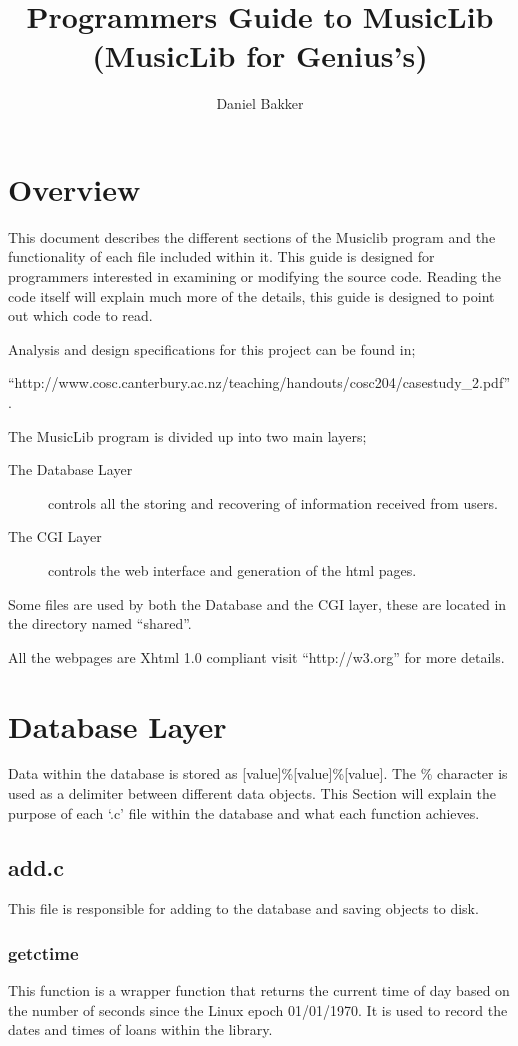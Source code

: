 \documentclass{article}
\title{Programmers Guide to MusicLib (MusicLib for Genius's)}
\author{Daniel Bakker}
\begin{document}
\maketitle
\tableofcontents
\newpage
\section{Overview}
This document describes the different sections of the Musiclib program and the functionality of each file included within it. This guide is designed for programmers interested in examining or modifying the source code. Reading the code itself will explain much more of the details, this guide is designed to point out which code to read.

Analysis and design specifications for this project can be found in;

 ``http://www.cosc.canterbury.ac.nz/teaching/handouts/cosc204/casestudy\_2.pdf''.

The MusicLib program is divided up into two main layers;
\begin{description} 
\item[The Database Layer] controls all the storing and recovering of information received from users.
\item[The CGI Layer] controls the web interface and generation of the html pages.
\end{description}

Some files are used by both the Database and the CGI layer, these are located in the directory named ``shared''.

All the webpages are Xhtml 1.0 compliant visit ``http://w3.org'' for more details.

\section{Database Layer}
Data within the database is stored as [value]\%[value]\%[value]. The \% character is used as a delimiter between different data objects. This Section will explain the purpose of each `.c' file within the database and what each function achieves.
\subsection{add.c}
This file is responsible for adding to the database and saving objects to disk.

\subsubsection*{getctime}
 This function is a wrapper function that returns the current time of day based on the number of seconds since the Linux epoch 01/01/1970. It is used to record the dates and times of loans within the library.
\end{document}
